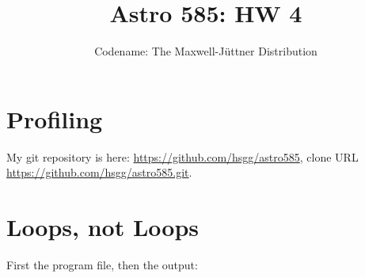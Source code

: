 \documentclass[11pt]{article}
\title{Astro 585: HW 4}
\author{Codename: The Maxwell-Jüttner Distribution}
\begin{document}
\maketitle

\section{Profiling}
My git repository is here: \url{https://github.com/hsgg/astro585}, clone URL
\url{https://github.com/hsgg/astro585.git}.

\section{Loops, not Loops}
First the program file, then the output:

\end{document}
